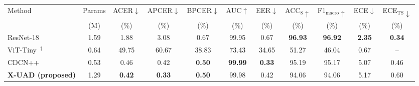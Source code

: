 \begin{tabular}{lcccccccccc}
\toprule
Method & Params & ACER$\downarrow$ & APCER$\downarrow$ & BPCER$\downarrow$ & AUC$\uparrow$ & EER$\downarrow$ & ACC$_8\uparrow$ & F1$_{\text{macro}}\uparrow$ & ECE$\downarrow$ & ECE$_{\text{TS}}\downarrow$ \\
 & (M) & (\%) & (\%) & (\%) & (\%) & (\%) & (\%) & (\%) & (\%) & (\%) \\
\midrule
ResNet-18~\cite{he2016resnet} & 1.59 & 1.88 & 3.08 & 0.67 & 99.95 & 0.67 & \textbf{96.93} & \textbf{96.92} & \textbf{2.35} & \textbf{0.34} \\
ViT-Tiny~\cite{dosovitskiy2021vit}$^{\dagger}$ & 0.64 & 49.75 & 60.67 & 38.83 & 73.43 & 34.65 & 51.27 & 46.04 & 0.67 & -- \\
CDCN++~\cite{yu2020cdcn} & 0.53 & 0.46 & 0.42 & \textbf{0.50} & \textbf{99.99} & \textbf{0.33} & 95.19 & 95.17 & 5.07 & 0.46 \\
\textbf{X-UAD (proposed)} & 1.29 & \textbf{0.42} & \textbf{0.33} & \textbf{0.50} & 99.98 & 0.42 & 94.06 & 94.06 & 5.17 & 0.60 \\
\bottomrule
\end{tabular}